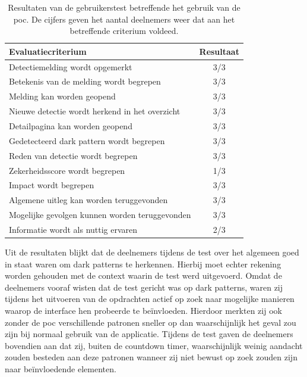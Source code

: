 \begin{table}[H]
    \centering
    \begin{tabular}{lc}
        \toprule
        Evaluatiecriterium & Resultaat \\
        \midrule
        Detectiemelding wordt opgemerkt & 3/3 \\
        Betekenis van de melding wordt begrepen & 3/3 \\
        Melding kan worden geopend & 3/3 \\
        Nieuwe detectie wordt herkend in het overzicht & 3/3 \\
        Detailpagina kan worden geopend & 3/3 \\
        Gedetecteerd dark pattern wordt begrepen & 3/3 \\
        Reden van detectie wordt begrepen & 3/3 \\
        Zekerheidsscore wordt begrepen & 1/3 \\
        Impact wordt begrepen & 3/3 \\
        Algemene uitleg kan worden teruggevonden & 3/3 \\
        Mogelijke gevolgen kunnen worden teruggevonden & 3/3 \\
        Informatie wordt als nuttig ervaren & 2/3 \\
        \bottomrule
    \end{tabular}
    \caption[Resultaten van de gebruikerstest betreffende het gebruik van de \acrshort{poc}]
    {Resultaten van de gebruikerstest betreffende het gebruik van de \acrshort{poc}. De cijfers geven het aantal deelnemers weer dat aan het betreffende criterium voldeed.}
    \label{tab:resultaten-gebruik-poc}
\end{table}

\vspace{0.5em}

Uit de resultaten blijkt dat de deelnemers tijdens de test over het algemeen goed in staat waren om dark patterns te herkennen. Hierbij moet echter rekening worden gehouden met de context waarin de test werd uitgevoerd. Omdat de deelnemers vooraf wisten dat de test gericht was op dark patterns, waren zij tijdens het uitvoeren van de opdrachten actief op zoek naar mogelijke manieren waarop de interface hen probeerde te beïnvloeden. Hierdoor merkten zij ook zonder de \acrshort{poc} verschillende patronen sneller op dan waarschijnlijk het geval zou zijn bij normaal gebruik van de applicatie. Tijdens de test gaven de deelnemers bovendien aan dat zij, buiten de countdown timer, waarschijnlijk weinig aandacht zouden besteden aan deze patronen wanneer zij niet bewust op zoek zouden zijn naar beïnvloedende elementen.

